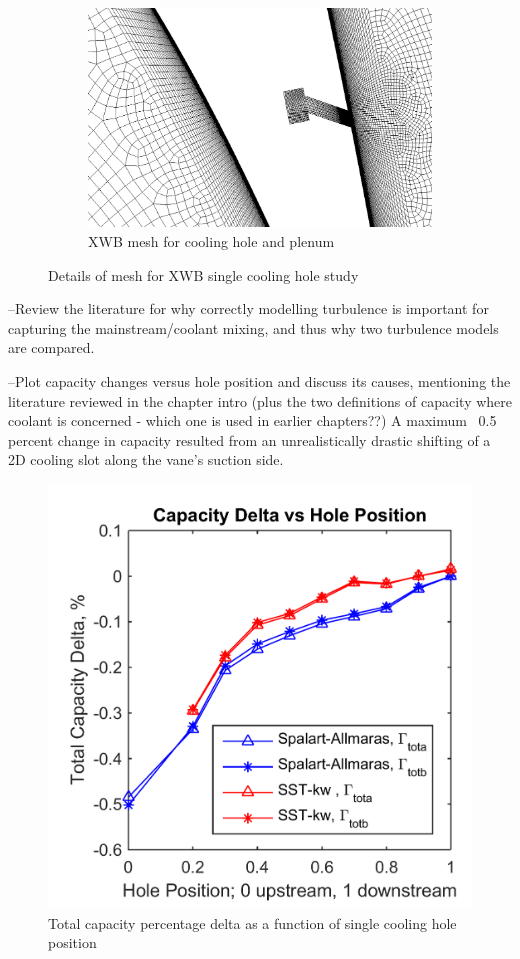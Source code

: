 \documentclass[a4paper, 11pt, twoside]{report}
\begin{document}
\begin{figure}[H]
  \hspace{0.05\textwidth}
  \begin{subfigure}{.45\textwidth}
    \centering
    \includegraphics[width=\linewidth]{figs/SCH_mesh_hole_placeholder.png}
    \caption{XWB mesh for cooling hole and plenum}
    \label{fig:SCH_mesh_3}
  \end{subfigure}
  \caption{Details of mesh for XWB single cooling hole study}
\end{figure}

--Review the literature for why correctly modelling turbulence is important for capturing the mainstream/coolant mixing, and thus why two turbulence models are compared.

--Plot capacity changes versus hole position and discuss its causes, mentioning the literature reviewed in the chapter intro (plus the two definitions of capacity where coolant is concerned - which one is used in earlier chapters??) A maximum ~0.5 percent change in capacity resulted from an unrealistically drastic shifting of a 2D cooling slot along the vane's suction side.
\begin{figure}[H]
      \centering
      \includegraphics[width=.45\textwidth]{figs/SCH_capacity_vs_hole_position.png}
      \caption{Total capacity percentage delta as a function of single cooling hole position}
      \label{fig:SCH_capacity_vs_hole_position}
\end{figure}
\end{document}
